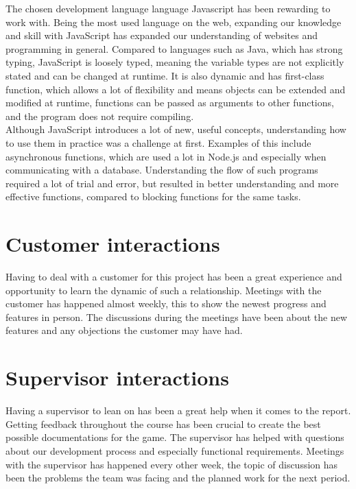 The chosen development language language Javascript has been rewarding to work with. Being the most used language on the web, expanding our knowledge and skill with JavaScript has expanded our understanding of websites and programming in general. Compared to languages such as Java, which has strong typing, JavaScript is loosely typed, meaning the variable types are not explicitly stated and can be changed at runtime. It is also dynamic and has first-class function, which allows a lot of flexibility and means objects can be extended and modified at runtime, functions can be passed as arguments to other functions, and the program does not require compiling.\\
\newline
Although JavaScript introduces a lot of new, useful concepts, understanding how to use them in practice was a challenge at first. Examples of this include asynchronous functions, which are used a lot in Node.js and especially when communicating with a database. Understanding the flow of such programs required a lot of trial and error, but resulted in better understanding and more effective functions, compared to blocking functions for the same tasks.\\


\section{Customer interactions}

Having to deal with a customer for this project has been a great experience and opportunity to learn the dynamic of such a relationship. Meetings with the customer has happened almost weekly, this to show the newest progress and features in person. The discussions during the meetings have been about the new features and any objections the customer may have had. 

\section{Supervisor interactions}
Having a supervisor to lean on has been a great help when it comes to the report. Getting feedback throughout the course has been crucial to create the best possible documentations for the game. The supervisor has helped with questions about our development process and especially functional requirements. Meetings with the supervisor has happened every other week, the topic of discussion has been the problems the team was facing and the planned work for the next period. 

